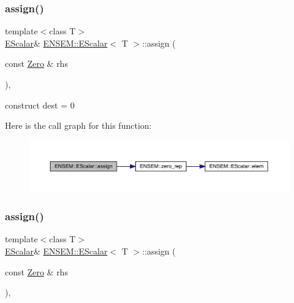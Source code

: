 \subsubsection{\texorpdfstring{assign()}{assign()}\hspace{0.1cm}{\footnotesize\ttfamily [4/9]}}
{\footnotesize\ttfamily template$<$class T$>$ \\
\mbox{\hyperlink{classENSEM_1_1EScalar}{E\+Scalar}}\& \mbox{\hyperlink{classENSEM_1_1EScalar}{E\+N\+S\+E\+M\+::\+E\+Scalar}}$<$ T $>$\+::assign (\begin{DoxyParamCaption}\item[{const \mbox{\hyperlink{structENSEM_1_1Zero}{Zero}} \&}]{rhs }\end{DoxyParamCaption})\hspace{0.3cm}{\ttfamily [inline]}, {\ttfamily [protected]}}



construct dest = 0 

Here is the call graph for this function\+:
\nopagebreak
\begin{figure}[H]
\begin{center}
\leavevmode
\includegraphics[width=350pt]{d0/d82/classENSEM_1_1EScalar_a6900444b0a609115a30ef8fc95a43da5_cgraph}
\end{center}
\end{figure}
\mbox{\label{classENSEM_1_1EScalar_a6900444b0a609115a30ef8fc95a43da5}} 
\subsubsection{\texorpdfstring{assign()}{assign()}\hspace{0.1cm}{\footnotesize\ttfamily [5/9]}}
{\footnotesize\ttfamily template$<$class T$>$ \\
\mbox{\hyperlink{classENSEM_1_1EScalar}{E\+Scalar}}\& \mbox{\hyperlink{classENSEM_1_1EScalar}{E\+N\+S\+E\+M\+::\+E\+Scalar}}$<$ T $>$\+::assign (\begin{DoxyParamCaption}\item[{const \mbox{\hyperlink{structENSEM_1_1Zero}{Zero}} \&}]{rhs }\end{DoxyParamCaption})\hspace{0.3cm}{\ttfamily [inline]}, {\ttfamily [protected]}}



